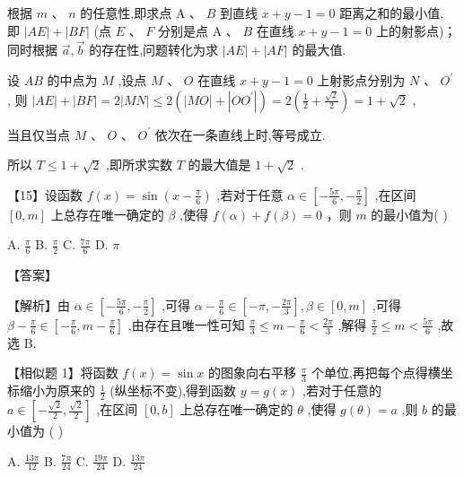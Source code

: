 \documentclass[10pt]{article}
\begin{document}
根据 \(m\text{ 、 }n\) 的任意性,即求点 \(\mathrm{A}\text{ 、 }B\) 到直线 \(x + y - 1 = 0\) 距离之和的最小值, 即 \(\left| {AE}\right|  + \left| {BF}\right|\) (点 \(E\text{ 、 }F\) 分别是点 \(\mathrm{A}\text{ 、 }B\) 在直线 \(x + y - 1 = 0\) 上的射影点)； 同时根据 \(\overrightarrow{a},\overrightarrow{b}\) 的存在性,问题转化为求 \(\left| {AE}\right|  + \left| {AF}\right|\) 的最大值.

设 \({AB}\) 的中点为 \(M\) ,设点 \(M\text{ 、 }O\) 在直线 \(x + y - 1 = 0\) 上射影点分别为 \(N\text{ 、 }{O}^{\prime }\) , 则 \(\left| {AE}\right|  + \left| {BF}\right|  = 2\left| {MN}\right|  \leq  2\left( {\left| {MO}\right|  + \left| {O{O}^{\prime }}\right| }\right)  = 2\left( {\frac{1}{2} + \frac{\sqrt{2}}{2}}\right)  = 1 + \sqrt{2}\) ,

当且仅当点 \(M\text{ 、 }O\text{ 、 }{O}^{\prime }\) 依次在一条直线上时,等号成立.

所以 \(T \leq  1 + \sqrt{2}\) ,即所求实数 \(T\) 的最大值是 \(1 + \sqrt{2}\) .

【15】设函数 \(f\left( x\right)  = \sin \left( {x - \frac{\pi }{6}}\right)\) ,若对于任意 \(\alpha  \in  \left\lbrack  {-\frac{5\pi }{6}, - \frac{\pi }{2}}\right\rbrack\) ,在区间 \(\left\lbrack  {0,m}\right\rbrack\) 上总存在唯一确定的 \(\beta\) ,使得 \(f\left( \alpha \right)  + f\left( \beta \right)  = 0\) ，则 \(m\) 的最小值为( )

A. \(\frac{\pi }{6}\) B. \(\frac{\pi }{2}\) C. \(\frac{7\pi }{6}\) D. \(\pi\)

【答案】

【解析】由 \(\alpha  \in  \left\lbrack  {-\frac{5\pi }{6}, - \frac{\pi }{2}}\right\rbrack\) ,可得 \(\alpha  - \frac{\pi }{6} \in  \left\lbrack  {-\pi , - \frac{2\pi }{3}}\right\rbrack  ,\beta  \in  \left\lbrack  {0,m}\right\rbrack\) ,可得 \(\beta  - \frac{\pi }{6} \in  \left\lbrack  {-\frac{\pi }{6},m - \frac{\pi }{6}}\right\rbrack\) ,由存在且唯一性可知 \(\frac{\pi }{3} \leq  m - \frac{\pi }{6} < \frac{2\pi }{3}\) ,解得 \(\frac{\pi }{2} \leq  m < \frac{5\pi }{6}\) ,故选 B.

【相似题 1】将函数 \(f\left( x\right)  = \sin x\) 的图象向右平移 \(\frac{\pi }{3}\) 个单位,再把每个点得横坐标缩小为原来的 \(\frac{1}{2}\) (纵坐标不变),得到函数 \(y = g\left( x\right)\) ,若对于任意的 \(a \in  \left\lbrack  {-\frac{\sqrt{2}}{2},\frac{\sqrt{2}}{2}}\right\rbrack\) ,在区间 \(\left\lbrack  {0,b}\right\rbrack\) 上总存在唯一确定的 \(\theta\) ,使得 \(g\left( \theta \right)  = a\) ,则 \(b\) 的最小值为 ( )

A. \(\frac{13\pi }{12}\) B. \(\frac{7\pi }{24}\) C. \(\frac{19\pi }{24}\) D. \(\frac{13\pi }{24}\)
\end{document}
